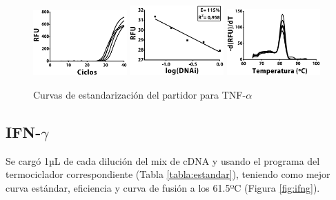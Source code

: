 \documentclass[12pt,letterpaper,oneside]{scrbook}
\begin{document}
\begin{figure}[h!]
\centering
        {\includegraphics[width=0.32\textwidth]{standarization/tnfa/ampl}}
        {\includegraphics[width=0.32\textwidth]{standarization/tnfa/stand}}
        {\includegraphics[width=0.32\textwidth]{standarization/tnfa/melting}}
        \caption{Curvas de estandarización del partidor para TNF-$\alpha$}
    \label {fig:tnfa}
\end{figure}

\subsection{IFN-$\gamma$}

Se cargó 1µL de cada dilución del mix de cDNA y usando el programa del
termociclador correspondiente (Tabla \ref{tabla:estandar}), teniendo
como mejor curva estándar, eficiencia y curva de fusión a los 61.5ºC
(Figura \ref{fig:ifng}).
\end{document}
